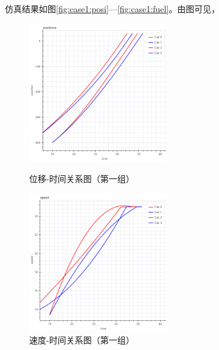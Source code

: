 仿真结果如图\ref{fig:case1:posi}---\ref{fig:case1:fuel}。由图可见，
\begin{figure}
\begin{minipage}{0.48\textwidth}
  \centering
  \includegraphics[height=6cm]{figures/sim_case1/posi.png}
  \caption{位移-时间关系图（第一组）}
  \label{fig:case1:posi}
\end{minipage}\hfill
\begin{minipage}{0.48\textwidth}
  \centering
  \includegraphics[height=6cm]{figures/sim_case1/speed.png}
  \caption{速度-时间关系图（第一组）}
  \label{fig:case1:speed}
\end{minipage}
\end{figure}
